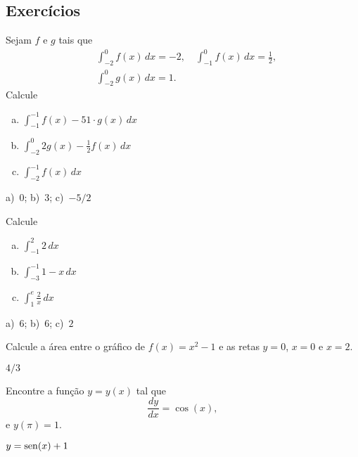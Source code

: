 \subsection{Exercícios}

\begin{exer}
  Sejam $f$ e $g$ tais que
  \begin{align}
    &\int_{-2}^{0} f(x)\,dx = -2,\quad\int_{-1}^{0} f(x)\,dx = \frac{1}{2},\\
    &\int_{-2}^0 g(x)\,dx = 1.
  \end{align}
  Calcule
  \begin{enumerate}[a)]
  \item $\displaystyle \int_{-1}^{-1} f(x) - 51\cdot g(x)\,dx$
  \item $\displaystyle \int_{-2}^{0} 2g(x) - \frac{1}{2}f(x)\,dx$
  \item $\displaystyle \int_{-2}^{-1} f(x)\,dx$
  \end{enumerate}
\end{exer}
\begin{resp}
  a)~$0$; b)~$3$; c)~$-5/2$
\end{resp}

\begin{exer}
  Calcule
  \begin{enumerate}[a)]
  \item $\displaystyle\int_{-1}^2 2\,dx$
  \item $\displaystyle\int_{-3}^{-1} 1-x\,dx$
  \item $\displaystyle\int_{1}^{e} \frac{2}{x}\,dx$
  \end{enumerate}
\end{exer}
\begin{resp}
  a)~$6$; b)~$6$; c)~$2$
\end{resp}

\begin{exer}
  Calcule a área entre o gráfico de $f(x) = x^2-1$ e as retas $y=0$, $x=0$ e $x=2$.
\end{exer}
\begin{resp}
  $4/3$
\end{resp}

\begin{exer}
  Encontre a função $y = y(x)$ tal que
  \begin{equation}
    \frac{dy}{dx} = \cos(x),
  \end{equation}
  e $y(\pi) = 1$.
\end{exer}
\begin{resp}
  $y = \operatorname{sen}(x) + 1$
\end{resp}

